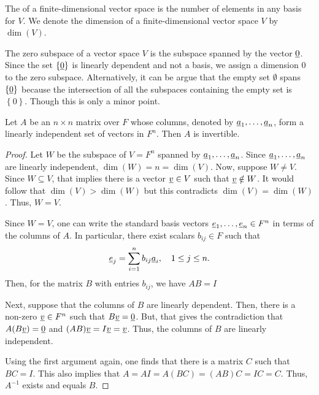 \begin{definition}
The  of a finite-dimensional vector space is the number of elements in any basis for $V$.
We denote the dimension of a finite-dimensional vector space $V$ by $\dim(V)$.
\end{definition}

The zero subspace of a vector space $V$ is the subspace spanned by the vector $\underline{0}$.
Since the set $\left\{ \underline{0} \right\}$ is linearly dependent and not a basis, we assign a dimension $0$ to the zero subspace.
Alternatively, it can be argue that the empty set $\emptyset$ spans $\left\{ \underline{0} \right\}$ because the intersection of all the subspaces containing the empty set is $\left\{ 0 \right\}$.
Though this is only a minor point.

\begin{theorem}
Let $A$ be an $n \times n$ matrix over $F$ whose columns, denoted by $\underline{a}_1, \ldots, \underline{a}_n$, form a linearly independent set of vectors in $F^{n}$.
Then $A$ is invertible.
\end{theorem}
\begin{proof}
Let $W$ be the subspace of $V=F^n$ spanned by $\underline{a}_1, \ldots, \underline{a}_n$.
Since $\underline{a}_1, \ldots, \underline{a}_n$ are linearly independent, $\dim(W) = n = \dim(V)$.
Now, suppose $W \neq V$.
Since $W \subseteq V$, that implies there is a vector $\underline{v} \in V$ such that $\underline{v} \notin W$.
It would follow that $\dim(V) > \dim(W)$ but this contradicts $\dim(V) = \dim(W)$.
Thus, $W=V$.

Since $W = V$, one can write the standard basis vectors  $\underline{e}_1,\ldots,\underline{e}_n \in F^n$ in terms of the columns of $A$.
In particular, there exist scalars $b_{ij} \in F$ such that
\begin{equation*}
\underline{e}_j = \sum_{i=1}^n b_{ij} \underline{a}_i, \quad 1 \leq j \leq n.
\end{equation*}
Then, for the matrix $B$ with entries $b_{ij}$, we have $AB = I$

Next, suppose that the columns of $B$ are linearly dependent.
Then, there is a non-zero $\underline{v} \in F^n$ such that $B\underline{v} = \underline{0}$.
But, that gives the contradiction that $A(B\underline{v}) = \underline{0}$ and $(AB)\underline{v} = I \underline{v} = \underline{v}$.
Thus, the columns of $B$ are linearly independent.

Using the first argument again, one finds that there is a matrix $C$ such that $BC = I$.
This also implies that $A = AI = A(BC) = (AB)C = IC = C$.
Thus, $A^{-1}$ exists and equals $B$.
\end{proof}


